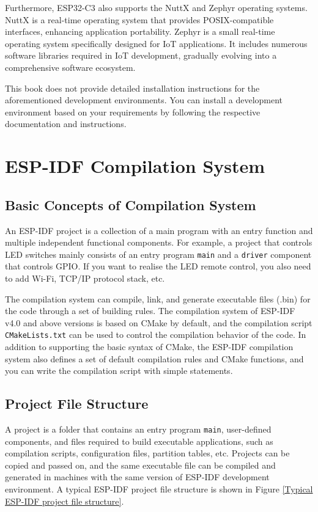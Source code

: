 \documentclass[a4paper,12pt]{book}
\begin{document}
Furthermore, ESP32-C3 also supports the NuttX and Zephyr operating systems. NuttX is a real-time operating system that provides POSIX-compatible interfaces, enhancing application portability. Zephyr is a small real-time operating system specifically designed for IoT applications. It includes numerous software libraries required in IoT development, gradually evolving into a comprehensive software ecosystem.

This book does not provide detailed installation instructions for the aforementioned development environments. You can install a development environment based on your requirements by following the respective documentation and instructions.

\section{ESP-IDF Compilation System}
\subsection{Basic Concepts of Compilation System}
An ESP-IDF project is a collection of a main program with an entry function and multiple independent functional components. For example, a project that controls LED switches mainly consists of an entry program \verb|main| and a \verb|driver| component that controls GPIO. If you want to realise the LED remote control, you also need to add Wi-Fi, TCP/IP protocol stack, etc.

The compilation system can compile, link, and generate executable files (.bin) for the code through a set of building rules. The compilation system of ESP-IDF v4.0 and above versions is based on CMake by default, and the compilation script \verb|CMakeLists.txt| can be used to control the compilation behavior of the code. In addition to supporting the basic syntax of CMake, the ESP-IDF compilation system also defines a set of default compilation rules and CMake functions, and you can write the compilation script with simple statements.

\subsection{Project File Structure}
A project is a folder that contains an entry program \verb|main|, user-defined components, and files required to build executable applications, such as compilation scripts, configuration files, partition tables, etc. Projects can be copied and passed on, and the same executable file can be compiled and generated in machines with the same version of ESP-IDF development environment. A typical ESP-IDF project file structure is shown in Figure \ref{Typical ESP-IDF project file structure}.
\end{document}
